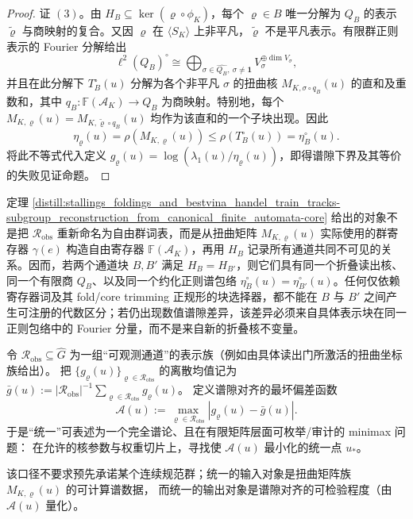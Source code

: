 \begin{proof}
证 \((3)\)。由 \(H_B\subseteq\ker(\varrho\circ\phi_K)\)，每个 \(\varrho\in B\) 唯一分解为 \(Q_B\) 的表示 \(\widetilde\varrho\) 与商映射的复合。又因 \(\varrho\) 在 \(\langle S_K\rangle\) 上非平凡，\(\widetilde\varrho\) 不是平凡表示。有限群正则表示的 Fourier 分解给出
\[
\ell^2(Q_B)^\circ\cong\bigoplus_{\sigma\in\widehat{Q_B},\ \sigma\ne\mathbf 1} V_\sigma^{\oplus\dim V_\sigma},
\]
并且在此分解下 \(T_B^\circ(u)\) 分解为各个非平凡 \(\sigma\) 的扭曲核 \(M_{K,\sigma\circ q_B}(u)\) 的直和及重数和，其中 \(q_B:\mathbb F(\mathcal A_K)\to Q_B\) 为商映射。特别地，每个 \(M_{K,\varrho}(u)=M_{K,\widetilde\varrho\circ q_B}(u)\) 均作为该直和的一个子块出现。因此
\[
\eta_\varrho(u)=\rho(M_{K,\varrho}(u))\leq\rho(T_B^\circ(u))=\eta_B^\circ(u).
\]
将此不等式代入定义 \(g_\varrho(u)=\log(\lambda_1(u)/\eta_\varrho(u))\)，即得谱隙下界及其等价的失败见证命题。
\end{proof}

\begin{remark}[谱隙对齐中的伪不变量剔除]\label{distill:stallings_foldings_and_bestvina_handel_train_tracks-subgroup_reconstruction_from_canonical_finite_automata-pseudo}
定理 \ref{distill:stallings_foldings_and_bestvina_handel_train_tracks-subgroup_reconstruction_from_canonical_finite_automata-core} 给出的对象不是把 \(\mathcal R_{\mathrm{obs}}\) 重新命名为自由群词表，而是从扭曲矩阵 \(M_{K,\varrho}(u)\) 实际使用的群寄存器 \(\gamma(e)\) 构造自由寄存器 \(\mathbb F(\mathcal A_K)\)，再用 \(H_B\) 记录所有通道共同不可见的关系。因而，若两个通道块 \(B,B'\) 满足 \(H_B=H_{B'}\)，则它们具有同一个折叠读出核、同一个有限商 \(Q_B\)、以及同一个约化正则谱包络 \(\eta_B^\circ(u)=\eta_{B'}^\circ(u)\)。任何仅依赖寄存器词及其 fold/core trimming 正规形的块选择器，都不能在 \(B\) 与 \(B'\) 之间产生可注册的代数区分；若仍出现数值谱隙差异，该差异必须来自具体表示块在同一正则包络中的 Fourier 分量，而不是来自新的折叠核不变量。
\end{remark}

\begin{remark}\label{rem:spec-gap-minimax-unification}
令 \(\mathcal{R}_{\mathrm{obs}}\subseteq \widehat G\) 为一组“可观测通道”的表示族（例如由具体读出门所激活的扭曲坐标族给出）。
把 \(\{g_{\varrho}(u)\}_{\varrho\in\mathcal{R}_{\mathrm{obs}}}\) 的离散均值记为
\(
\bar g(u):=|\mathcal{R}_{\mathrm{obs}}|^{-1}\sum_{\varrho\in\mathcal{R}_{\mathrm{obs}}}g_{\varrho}(u)
\)。
定义谱隙对齐的最坏偏差函数
\[
\mathcal{A}(u):=\max_{\varrho\in\mathcal{R}_{\mathrm{obs}}}\left|g_{\varrho}(u)-\bar g(u)\right|.
\]
于是“统一”可表述为一个完全谱论、且在有限矩阵层面可枚举/审计的 minimax 问题：
在允许的核参数与权重切片上，寻找使 \(\mathcal{A}(u)\) 最小化的统一点 \(u_\ast\)。
\par
该口径不要求预先承诺某个连续规范群；统一的输入对象是扭曲矩阵族 \(M_{K,\varrho}(u)\) 的可计算谱数据，
而统一的输出对象是谱隙对齐的可检验程度（由 \(\mathcal{A}(u)\) 量化）。
\end{remark}

